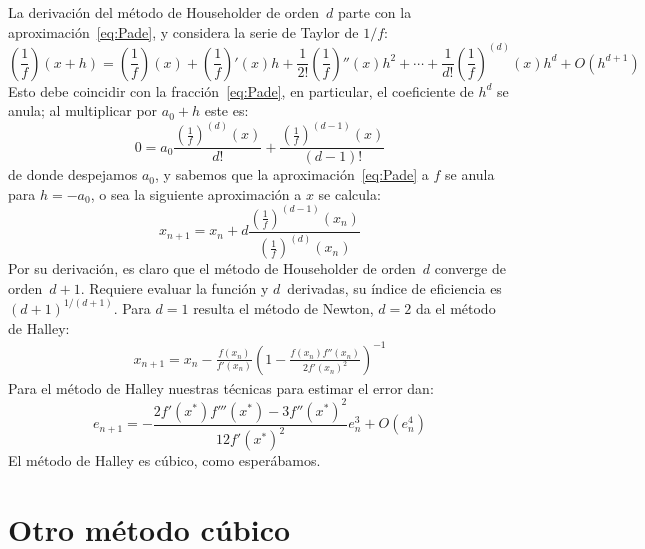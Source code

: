   La derivación del método de Householder de orden~\(d\)
  parte con la aproximación~\eqref{eq:Pade},
  y considera la serie de Taylor de \(1/f\):
  \begin{equation*}
    \left( \frac{1}{f} \right)(x + h)
      = \left(\frac{1}{f} \right)(x)
          + \left(\frac{1}{f} \right)'(x) h
          + \frac{1}{2!} \left(\frac{1}{f} \right)''(x) h^2
          + \dotsb
          + \frac{1}{d!} \left(\frac{1}{f} \right)^{(d)}(x) h^d
          + O(h^{d + 1})
  \end{equation*}
  Esto debe coincidir con la fracción~\eqref{eq:Pade},
  en particular,
  el coeficiente de \(h^d\) se anula;
  al multiplicar por \(a_0 + h\) este es:
  \begin{equation*}
    0
      = a_0 \frac{\left(\frac{1}{f}\right)^{(d)}(x)}{d!}
          + \frac{\left(\frac{1}{f}\right)^{(d - 1)}(x)}{(d - 1)!}
  \end{equation*}
  de donde despejamos \(a_0\),
  y sabemos que la aproximación~\eqref{eq:Pade} a \(f\)
  se anula para \(h = -a_0\),
  o sea la siguiente aproximación a \(x\) se calcula:
  \begin{equation}
    x_{n + 1}
      = x_n + d \frac{\left( \frac{1}{f} \right)^{(d - 1)}(x_n)}
                     {\left( \frac{1}{f} \right)^{(d)}(x_n)}
  \end{equation}
  Por su derivación,
  es claro que el método de Householder de orden~\(d\)
  converge de orden~\(d + 1\).
  Requiere evaluar la función y \(d\)~derivadas,
  su índice de eficiencia es \((d + 1)^{1 / (d + 1)}\).
  Para \(d = 1\)
  resulta el método de Newton,
  \(d = 2\) da el método de Halley:
  \begin{align}
    \label{eq:Halley-iteration}
    x_{n + 1}
      = x_n
          - \frac{f(x_n)}{f'(x_n)}
              \left(
                1 - \frac{f(x_n) f''(x_n)}{2 f'(x_n)^2}
              \right)^{-1}
  \end{align}
  Para el método de Halley nuestras técnicas para estimar el error dan:
  \begin{equation}
    \label{eq:Halley-iteration-error}
    e_{n + 1}
      = - \frac{2 f'(x^*) f'''(x^*) - 3 f''(x^*)^2}{12 f'(x^*)^2} e_n^3
            + O(e_n^4)
  \end{equation}
  El método de Halley es cúbico,
  como esperábamos.

\section{Otro método cúbico}
\label{sec:metodo-cubico}

